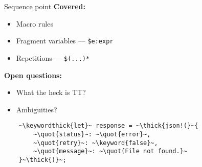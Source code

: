 \documentclass[usepdftitle=false,aspectratio=169]{beamer}
\newcommand{\thick}[1]{\contourlength{0.16pt}\contour[10]{black}{#1}}
\newcommand{\slantbox}[2][.5]
  {%
    \mbox
      {%
        \sbox{\foobox}{#2}%
        \hskip\wd\foobox
        \pdfsave
        \pdfsetmatrix{1 0 #1 1}%
        \llap{\usebox{\foobox}}%
        \pdfrestore
      }%
  }
\newcommand{\backslantbox}[2][.5]
  {%
    \mbox
      {%
        \sbox{\foobox}{#2}%
        \hskip\wd\foobox
        \pdfsave
        \pdfsetmatrix{-1 0 #1 1}%
        \llap{\usebox{\foobox}}%
        \pdfrestore
      }%
  }
\newcommand{\openquote}{\backslantbox[.2]{\hspace{11pt}''\hspace{-11pt}}}
\newcommand{\closequote}{\slantbox[-.2]{\hspace{2pt}''\hspace{-2pt}}}
\newcommand{\blackquote}[1]{\openquote#1\closequote}
\newcommand{\quot}[1]{{\color{redish}\blackquote{#1}}}
\newcommand{\keyword}[1]{\color{greenish}#1}
\newcommand{\keywordthick}[1]{\color{greenish}\contourlength{0.20pt}\contour[10]{greenish}{#1}}
\begin{document}
\begin{frame}[fragile]{Sequence point}
  \setlength{\leftmargini}{50pt}
  \vspace{8pt}
  \textbf{\large Covered:}
  \begin{itemize}[label=\footnotesize{},labelsep=10pt]
  \vspace{-6pt}
  \item Macro rules
  \vspace{-6pt}
  \item Fragment variables --- \texttt{\$e:expr}
  \vspace{-6pt}
  \item Repetitions --- \texttt{\$(...)*}
  \end{itemize}
  \vspace{8pt}
  \textbf{\large Open questions:}
  \begin{itemize}[label=\footnotesize{},labelsep=10pt]
  \vspace{-6pt}
  \item What the heck is TT?
  \vspace{-6pt}
  \item Ambiguities?
  \end{itemize}
\end{frame}

\begin{frame}[fragile]
  \begin{verbatim}
    ~\keywordthick{let}~ response = ~\thick{json!(}~{
        ~\quot{status}~: ~\quot{error}~,
        ~\quot{retry}~: ~\keyword{false}~,
        ~\quot{message}~: ~\quot{File not found.}~
    }~\thick{)}~;
  \end{verbatim}
\end{frame}
\end{document}

